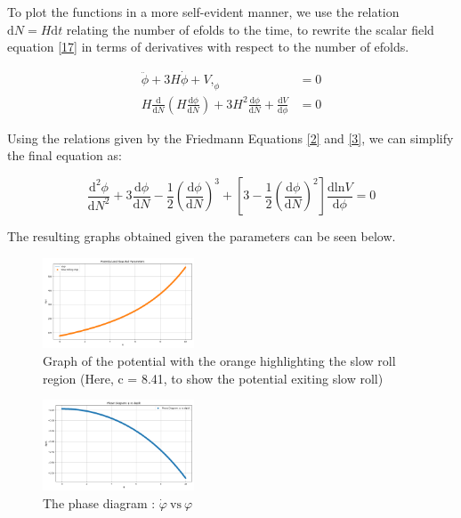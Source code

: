 \documentclass[aps,prd,reprint,preprintnumbers,showpacs,floatfix,nofootinbib,superscript address]{revtex4-2}
\begin{document}
To plot the functions in a more self-evident manner, we use the relation $\mathrm{d}N = H \mathrm{d}t$ relating the number of efolds to the time, to rewrite the scalar field equation \ref{17} in terms of derivatives with respect to the number of efolds.

\begin{align}
    \ddot{\phi} + 3H\dot{\phi} + V,_\phi &= 0 
    \\
    H \frac{\mathrm{d}}{\mathrm{d}N} \left(H \frac{\mathrm{d}\phi}{\mathrm{d}N} \right) + 3 H^2 \frac{\mathrm{d}\phi}{\mathrm{d}N} + \frac{\mathrm{d}V}{\mathrm{d}\phi} &= 0    
\end{align}

Using the relations given by the Friedmann Equations \ref{2} and \ref{3}, we can simplify the final equation as:

\begin{equation}
    \frac{\mathrm{d}^2\phi}{\mathrm{d}N^2} + 3 \frac{\mathrm{d}\phi}{\mathrm{d}N} - \frac{1}{2} \left( \frac{\mathrm{d}\phi}{\mathrm{d}N} \right)^3 + \left[ 3 - \frac{1}{2} \left( \frac{\mathrm{d}\phi}{\mathrm{d}N} \right)^2 \right] \frac{\mathrm{d}\text{ln}V}{\mathrm{d}\phi}  = 0
\end{equation}

The resulting graphs obtained given the parameters can be seen below. 

\begin{figure}[h!]
    \centering
    \includegraphics[width=0.4\textwidth]{Potential and Slow-Roll Parameters.png}
    \caption{Graph of the potential with the orange highlighting the slow roll region (Here, c = 8.41, to show the potential exiting slow roll)}
    \label{Potential as plotted by the code}
\end{figure}

\begin{figure}[h!]
    \centering
    \includegraphics[width=0.4\textwidth]{Phase Diagram p vs dpdt.png}
    \caption{The phase diagram : $\dot{\varphi} \ \text{vs} \ \varphi$}
    \label{Phase Diagram}
\end{figure}
\end{document}
